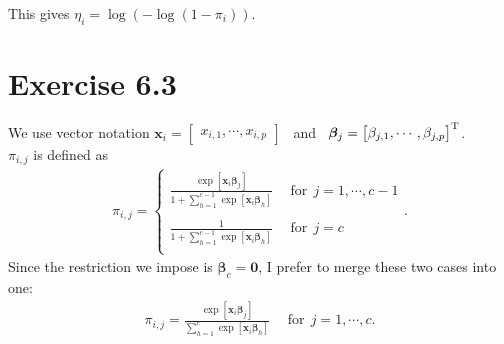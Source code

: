 \documentclass[a4paper]{article}
\begin{document}
This gives $\eta_{i} = \log\left(-\log\left(1-\pi_{i}\right)\right)$.



\vspace{\baselineskip}
\section{Exercise 6.3}
We use vector notation
$\bm{x}_{i} =
\begin{bmatrix}
x_{i,1}, \cdots, x_{i,p}
\end{bmatrix}$
~and~
$\bm{\beta}_{j} =
\begin{bmatrix}
\beta_{j,1}, \cdots, \beta_{j,p}
\end{bmatrix}^{\rm T}$.\\

$\pi_{i,j}$ is defined as
\begin{align*}
\pi_{i,j} =
\begin{cases}
\frac{\exp\left[\bm{x}_{i}\bm{\beta}_{j}\right]}{1+\sum_{h=1}^{c-1}\exp\left[\bm{x}_{i}\bm{\beta}_{h}\right]} ~~&\mbox{for}~~ j = 1, \cdots, c-1\\
\\
\frac{1}{1+\sum_{h=1}^{c-1}\exp\left[\bm{x}_{i}\bm{\beta}_{h}\right]} ~~&\mbox{for}~~ j = c\\
\end{cases}.
\end{align*}
Since the restriction we impose is $\bm{\beta}_{c} = \bm{0}$, I prefer to merge these two cases into one: 
\begin{align*}
\pi_{i,j} =
\frac{\exp\left[\bm{x}_{i}\bm{\beta}_{j}\right]}{\sum_{h=1}^{c}\exp\left[\bm{x}_{i}\bm{\beta}_{h}\right]} ~~&\mbox{for}~~ j = 1, \cdots, c.
\end{align*}
\end{document}
